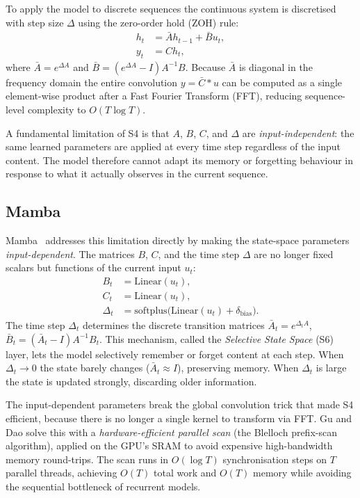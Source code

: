 To apply the model to discrete sequences the continuous system is discretised
with step size $\Delta$ using the zero-order hold (ZOH) rule:
\begin{align}
    h_t &= \bar{A} h_{t-1} + \bar{B} u_t, \label{eq:s4_discrete_h}\\
    y_t &= C h_t, \label{eq:s4_discrete_y}
\end{align}
where $\bar{A} = e^{\Delta A}$ and $\bar{B} = (e^{\Delta A} - I)A^{-1}B$.
Because $\bar{A}$ is diagonal in the frequency domain the entire convolution
$y = \bar{C} * u$ can be computed as a single element-wise product after a
Fast Fourier Transform (FFT), reducing sequence-level complexity to $O(T \log T)$.

A fundamental limitation of S4 is that $A$, $B$, $C$, and $\Delta$ are
\emph{input-independent}: the same learned parameters are applied at every
time step regardless of the input content. The model therefore cannot adapt
its memory or forgetting behaviour in response to what it actually observes
in the current sequence.

\subsection{Mamba}

Mamba~\cite{gu2023mamba} addresses this limitation directly by making the
state-space parameters \emph{input-dependent}. The matrices $B$, $C$, and the
time step $\Delta$ are no longer fixed scalars but functions of the current
input $u_t$:
\begin{align}
    B_t      &= \mathrm{Linear}(u_t),  \\
    C_t      &= \mathrm{Linear}(u_t),  \\
    \Delta_t &= \mathrm{softplus}\bigl(\mathrm{Linear}(u_t) + \delta_\mathrm{bias}\bigr).
\end{align}
The time step $\Delta_t$ determines the discrete transition matrices
$\bar{A}_t = e^{\Delta_t A}$, $\bar{B}_t = (\bar{A}_t - I) A^{-1} B_t$.
This mechanism, called the \emph{Selective State Space} (S6) layer, lets the
model selectively remember or forget content at each step. When
$\Delta_t \to 0$ the state barely changes ($\bar{A}_t \approx I$),
preserving memory. When $\Delta_t$ is large the state is updated strongly,
discarding older information.

The input-dependent parameters break the global convolution trick that made
S4 efficient, because there is no longer a single kernel to transform via FFT. Gu and Dao
solve this with a \emph{hardware-efficient parallel scan} (the Blelloch
prefix-scan algorithm), applied on the GPU's SRAM to avoid expensive
high-bandwidth memory round-trips. The scan runs in $O(\log T)$
synchronisation steps on $T$ parallel threads, achieving $O(T)$ total
work and $O(T)$ memory while avoiding the sequential bottleneck of recurrent
models.

